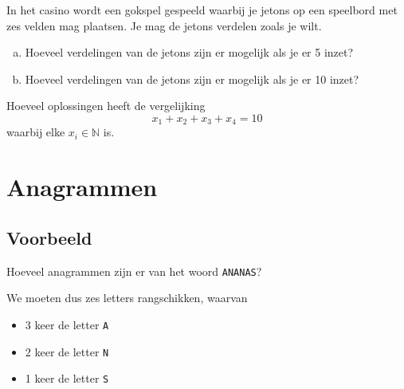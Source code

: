 \documentclass[12pt,a4paper,twoside]{article}
\begin{document}
\begin{oefening}
In het casino wordt een gokspel gespeeld waarbij je jetons op een speelbord met zes velden mag plaatsen. Je mag de jetons verdelen zoals je wilt.
\begin{enumerate}[(a)]
  \item Hoeveel verdelingen van de jetons zijn er mogelijk als je er 5 inzet?
  \item Hoeveel verdelingen van de jetons zijn er mogelijk als je er 10 inzet?
\end{enumerate}
\end{oefening}

\begin{oefening} %
Hoeveel oplossingen heeft de vergelijking
$$x_1 + x_2 + x_3 + x_4 = 10$$
waarbij elke $x_i\in\mathbb{N}$ is.
\end{oefening}

\cleardoublepage
\section{Anagrammen}

\subsection{Voorbeeld}

Hoeveel anagrammen zijn er van het woord \verb#ANANAS#?

We moeten dus zes letters rangschikken, waarvan
\begin{itemize}
  \item 3 keer de letter \verb#A#
  \item 2 keer de letter \verb#N#
  \item 1 keer de letter \verb#S#
\end{itemize}
\end{document}
